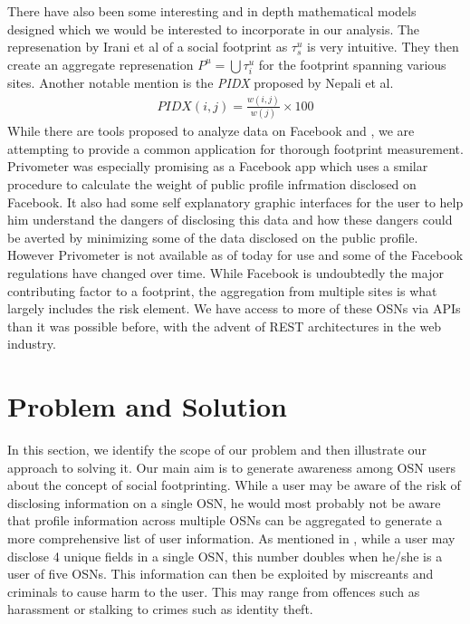 \documentclass[10pt,conference]{IEEEtran}
\begin{document}
There have also been some interesting and in depth mathematical models designed which we would be interested to incorporate in our analysis. The represenation by Irani et al \cite{leakage} of a social footprint as \(\tau_{s}^{u}\) is very intuitive. They then create an aggregate represenation \(P^{u}=\bigcup\tau_{i}^{u}\) for the footprint spanning various sites. Another notable mention is the {\sl PIDX} proposed by Nepali et al. \cite{pidx}
\begin{align*}
PIDX(i,j) = \frac{w(i,j)}{w(j)}\times100
\end{align*}
While there are tools proposed to analyze data on Facebook \cite{privometer} and \cite{privaware}, we are attempting to provide a common application for thorough footprint measurement. Privometer was especially promising as a Facebook app which uses a smilar procedure to calculate the weight of public profile infrmation disclosed on Facebook. It also had some self explanatory graphic interfaces for the user to help him understand the dangers of disclosing this data and how these dangers could be averted by minimizing some of the data disclosed on the public profile. However Privometer is not available as of today for use and some of the Facebook regulations have changed over time. While Facebook is undoubtedly the major contributing factor to a footprint, the aggregation from multiple sites is what largely includes the risk element. We have access to more of these OSNs via APIs than it was possible before, with the advent of REST architectures in the web industry.

\section{Problem and Solution}
In this section, we identify the scope of our problem and then illustrate our approach to solving it. Our main aim is to generate awareness among OSN users about the concept of social footprinting. While a user may be aware of the risk of disclosing information on a single OSN, he would most probably not be aware that profile information across multiple OSNs can be aggregated to generate a more comprehensive list of user information. As mentioned in \cite{emergingthreat}, while a user may disclose 4 unique fields in a single OSN, this number doubles when he/she is a user of five OSNs. This information can then be exploited by miscreants and criminals to cause harm to the user. This may range from offences such as harassment or stalking to crimes such as identity theft. \\
\end{document}
